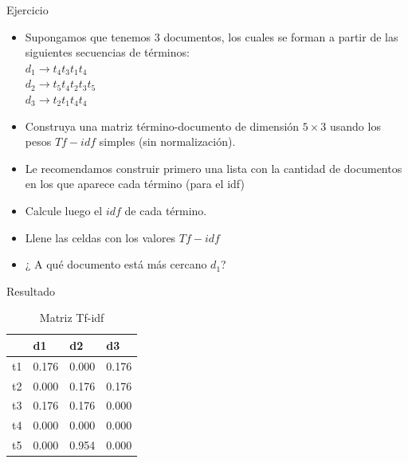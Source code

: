 \documentclass[handout]{beamer}
\begin{document}
\begin{frame}{Ejercicio}
\begin{itemize}
 \item Supongamos que tenemos $3$ documentos, los cuales se forman a partir de las siguientes secuencias de términos: \\
 $d_{1}\rightarrow t_{4}t_{3}t_{1}t_{4}$ \\
 $d_{2}\rightarrow t_{5}t_{4}t_{2}t_{3}t_{5}$ \\
 $d_{3}\rightarrow t_{2}t_{1}t_{4}t_{4}$ \\

\item Construya una matriz término-documento de dimensión $5 \times 3$ usando los pesos $Tf-idf$ simples (sin normalización).
\item Le recomendamos construir primero una lista con la cantidad de documentos en los que aparece cada término (para el idf) 
\item Calcule luego  el $idf$ de cada término.
\item Llene las celdas con los valores $Tf-idf$
\item ¿ A qué documento está más cercano $d_{1}$?
\end{itemize}


\end{frame}

\begin{frame}{Resultado}
 \begin{table}[htbp]
\caption{Matriz Tf-idf}
\begin{tabular}{|l|r|r|r|}
\hline
 & \multicolumn{1}{l|}{d1} & \multicolumn{1}{l|}{d2} & \multicolumn{1}{l|}{d3} \\ \hline
t1 & 0.176 & 0.000 & 0.176 \\ \hline
t2 & 0.000 & 0.176 & 0.176 \\ \hline
t3 & 0.176 & 0.176 & 0.000 \\ \hline
t4 & 0.000 & 0.000 & 0.000 \\ \hline
t5 & 0.000 & 0.954 & 0.000 \\ \hline
\end{tabular}
\end{table}

\end{frame}
\end{document}
